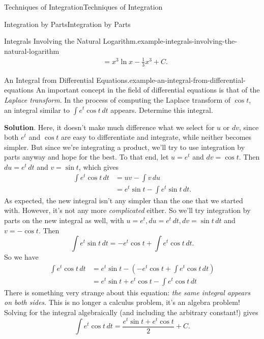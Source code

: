 \documentclass[10pt,]{book}
\numberwithin{equation}{section}
\begin{document}
\begin{chapterptx}{Techniques of Integration}{}{Techniques of Integration}{}{}
\begin{sectionptx}{Integration by Parts}{}{Integration by Parts}{}{}
\begin{example}{Integrals Involving the Natural Logarithm.}{example-integrals-involving-the-natural-logarithm}
\begin{align*}
& = x^{3}\ln x - \frac{1}{3}x^{3} + C. 
\end{align*}
\end{example}
\begin{example}{An Integral from Differential Equations.}{example-an-integral-from-differential-equations}%
\hypertarget{p-509}{}%
An important concept in the field of differential equations is that of the \emph{Laplace transform}. In the process of computing the Laplace transform of \(\cos t\), an integral similar to \(\int e^{t}\cos t\,dt\) appears. Determine this integral.%
\par\smallskip%
\noindent\textbf{Solution}.\hypertarget{solution-112}{}\quad%
\hypertarget{p-510}{}%
Here, it doesn't make much difference what we select for \(u\) or \(dv\), since both \(e^{t}\) and \(\cos t\) are easy to differentiate and integrate, while neither becomes simpler. But since we're integrating a product, we'll try to use integration by parts anyway and hope for the best. To that end, let \(u = e^{t}\) and \(dv = \cos t\). Then \(du = e^{t}\,dt\) and \(v = \sin t\), which gives%
%
\begin{align*}
\int e^{t}\cos t\,dt & = uv - \int v\,du \\
& = e^{t}\sin t - \int e^{t}\sin t\,dt. 
\end{align*}
\hypertarget{p-511}{}%
As expected, the new integral isn't any simpler than the one that we started with. However, it's not any more \emph{complicated} either. So we'll try integration by parts on the new integral as well, with \(u = e^{t}, du = e^{t}\,dt, dv = \sin t\,dt\) and \(v = -\cos t\). Then%
%
\begin{equation*}
\int e^{t}\sin t\,dt = -e^{t}\cos t + \int e^{t}\cos t\,dt.
\end{equation*}
\hypertarget{p-512}{}%
So we have%
%
\begin{align*}
\int e^{t}\cos t\,dt & = e^{t}\sin t - (-e^{t}\cos t + \int e^{t}\cos t\,dt) \\
& = e^{t}\sin t + e^{t}\cos t - \int e^{t}\cos t\,dt 
\end{align*}
\hypertarget{p-513}{}%
There is something very strange about this equation: \emph{the same integral appears on both sides}. This is no longer a calculus problem, it's an algebra problem! Solving for the integral algebraically (and including the arbitrary constant!) gives%
\begin{equation*}
\int e^{t}\cos t\,dt = \frac{e^{t}\sin t + e^{t}\cos t}{2} + C.
\end{equation*}
%
\end{example}

\end{sectionptx}
\end{chapterptx}
\end{document}
